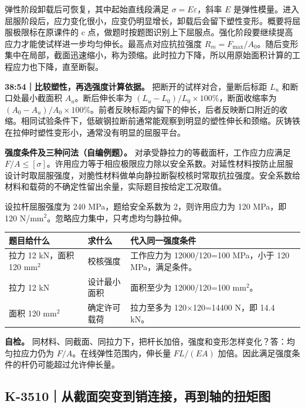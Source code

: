 \documentclass[zihao=5,a4paper,UTF8,fontset=fandol]{ctexart}
\begin{document}
弹性阶段卸载后可恢复，其中起始直线段满足 $\sigma=E\varepsilon$，斜率 $E$ 是弹性模量。进入屈服阶段后，应力变化很小，应变仍明显增长，卸载后会留下塑性变形。概要将屈服极限标在原课件的 c 点，做题时按题图识别上下屈服点。强化阶段要继续提高应力才能使试样进一步均匀伸长。最高点对应抗拉强度 $R_m=F_{\max}/A_0$。随后变形集中在局部，截面迅速缩小，称为颈缩。此时拉力下降，所以用原始面积计算的工程应力也下降，直至断裂。


\textbf{38:54｜比较塑性，再选强度计算依据。} 把断开的试样对合，量断后标距 $L_u$ 和断口处最小截面积 $A_u$。断后伸长率为 $(L_u-L_0)/L_0\times100\%$，断面收缩率为 $(A_0-A_u)/A_0\times100\%$。前者反映标距内留下的伸长，后者反映断口附近的收缩。相同试验条件下，低碳钢拉断前通常能观察到明显的塑性伸长和颈缩。灰铸铁在拉伸时塑性变形小，通常没有明显的屈服平台。


\textbf{强度条件及三种问法（自编例题）。} 对承受静拉力的等截面杆，工作应力应满足 $F/A\leq[\sigma]$。许用应力等于相应极限应力除以安全系数。对延性材料按防止屈服设计时取屈服强度，对脆性材料做单向静拉断裂校核时常取抗拉强度。安全系数给材料和载荷的不确定性留出余量，实际题目按给定工况取值。


设拉杆屈服强度为 240 MPa，题给安全系数为 2，则许用应力为 120 MPa，即 120 N/mm$^{2}$。忽略应力集中，只考虑均匀静拉伸。


\begin{longtable}{p{4.86cm}p{4.86cm}p{4.86cm}}
\toprule
题目给什么 & 求什么 & 代入同一强度条件 \\

\midrule
\endhead
拉力 12 kN，面积 120 mm$^{2}$ & 校核强度 & 工作应力为 12000/120=100 MPa，小于 120 MPa，满足条件。 \\
拉力 12 kN & 设计最小面积 & 面积至少为 12000/120=100 mm$^{2}$。 \\
面积 120 mm$^{2}$ & 确定许可载荷 & 拉力至多为 120$\times$120=14400 N，即 14.4 kN。 \\
\bottomrule
\end{longtable}

\textbf{自检。} 同材料、同截面、同拉力下，把杆长加倍，强度和变形怎样变化？答：均匀拉应力仍为 $F/A$。在线弹性范围内，伸长量 $FL/(EA)$ 加倍。因此满足强度条件的杆仍可能超过允许伸长量。





\subsection{K-3510｜从截面突变到销连接，再到轴的扭矩图}
\label{k-3510}
\end{document}
